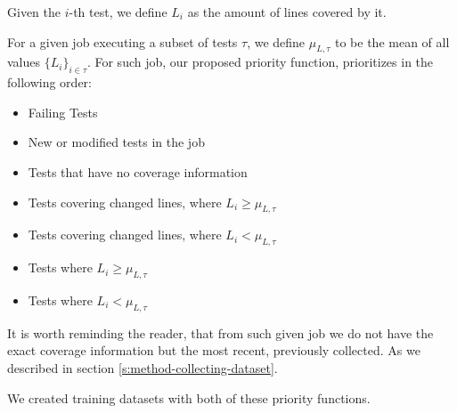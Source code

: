Given the $i$-th test, we define $L_i$ as the amount of lines covered by it.

For a given job executing a subset of tests $\tau$, we define $\mu_{L,\tau}$ to be the mean of
all values $\{L_i\}_{i \in \tau}$. For such job, our proposed priority function, prioritizes
in the following order:

\begin{itemize}
    \item Failing Tests
    \item New or modified tests in the job
    \item Tests that have no coverage information
    \item Tests covering changed lines, where $L_i \ge \mu_{L,\tau}$
    \item Tests covering changed lines, where $L_i < \mu_{L,\tau}$
    \item Tests where $L_i \ge \mu_{L,\tau}$
    \item Tests where $L_i < \mu_{L,\tau}$
\end{itemize}

It is worth reminding the reader, that from such given job we do not have the exact coverage information
but the most recent, previously collected. As we described in section \ref{s:method-collecting-dataset}.

We created training datasets with both of these priority functions.